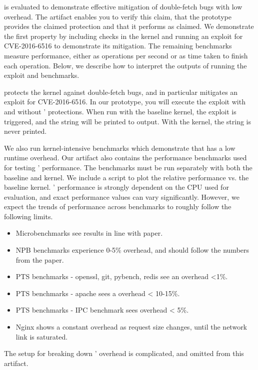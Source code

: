\midas{} is evaluated to demonstrate effective mitigation of
double-fetch bugs with low overhead. 
The artifact enables you to verify this claim, that the 
prototype provides the claimed protection and that it 
performs as claimed.
We demonstrate the first property by including checks in the
kernel and running an exploit for CVE-2016-6516 to demonstrate 
its mitigation.
The remaining benchmarks measure performance, either as operations
per second or as time taken to finish each operation.
Below, we describe how to interpret the outputs of running the exploit
and benchmarks.

\midas{} protects the kernel against double-fetch bugs, and in 
particular mitigates an exploit for CVE-2016-6516.
In our prototype, you will execute the exploit with and without
\midas{}' protections.
When run with the baseline kernel, the exploit is triggered, and the 
string  will be printed to 
 output.
With the \midas{} kernel, the string is never printed.

We also run kernel-intensive benchmarks which demonstrate that
\midas{} has a low runtime overhead. 
Our artifact also contains the performance benchmarks used for
testing \midas{}' performance.
The benchmarks must be run separately with both the baseline and
\midas{} kernel. 
We include a script to plot the relative performance vs. the 
baseline kernel.
\midas{}' performance is strongly dependent on the CPU used for
evaluation, and exact performance values can vary significantly.
However, we expect the trends of performance across benchmarks to
roughly follow the following limits.
\begin{itemize}
  \item Microbenchmarks see results in line with paper.
  \item NPB benchmarks experience 0-5\% overhead, and should follow the 
        numbers from the paper.
  \item PTS benchmarks - openssl, git, pybench, redis see an overhead <1\%.
  \item PTS benchmarks - apache sees a overhead < 10-15\%.
  \item PTS benchmarks - IPC benchmark sees overhead < 5\%.
  \item Nginx shows a constant overhead as request size changes, until the
        network link is saturated.
\end{itemize}

The setup for breaking down \midas{}' overhead is complicated, and omitted
from this artifact.

